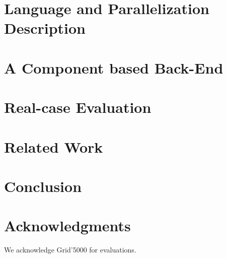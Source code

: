 \documentclass{acm_proc_article-sp}
\begin{document}
\section{Language and Parallelization Description}
\label{sect:msmsc}

\section{A Component based Back-End}
\label{sect:component}

\section{Real-case Evaluation}
\label{sect:eval}

\section{Related Work}
\label{sect:related}

\section{Conclusion}
\label{sect:conclusion}


\section{Acknowledgments}

We acknowledge Grid'5000 for evaluations.

\small

  
\end{document}
